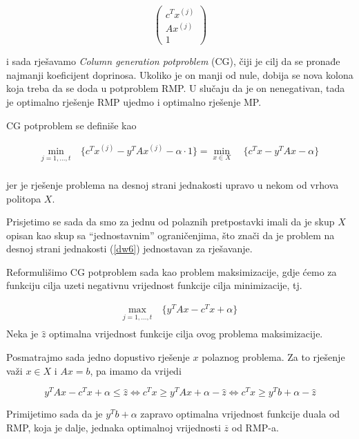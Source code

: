 \documentclass[a4paper, utf8, 11pt, colorlinks]{book}
\theoremstyle{definition}
\begin{document}
 $$\left(\begin{array}{c}
 	c^T x^{(j)}\\
 	A x^{(j)} \\
 	1 
 \end{array}\right)$$
 
 i sada rješavamo \emph{Column generation potproblem} (CG), čiji je cilj da se pronađe najmanji koeficijent doprinosa. Ukoliko je on manji od nule, dobija se nova kolona koja treba da se doda u potproblem RMP.  U slučaju da je on nenegativan, tada je optimalno rješenje RMP ujedmo i optimalno rješenje MP.
 
 CG potproblem se definiše kao
 
      \begin{equation}
 	\begin{aligned}\label{dw6}
 		\min_{j=1,\ldots,t}\  & \{c^T x^{(j)} -y^T	Ax^{(j)}-\alpha\cdot 1\}=\min_{x\in X}\  & \{c^Tx-y^T	Ax-\alpha\}\\
 	\end{aligned}
 \end{equation}
 
jer je rješenje problema na desnoj strani jednakosti upravo u nekom od vrhova politopa $X$.

Prisjetimo se sada da smo za jednu od polaznih pretpostavki imali da je skup $X$ opisan kao skup sa ``jednostavnim'' ograničenjima, što znači da je problem na desnoj strani jednakosti (\ref{dw6}) jednostavan za rješavanje.

Reformulišimo  CG potproblem sada kao problem maksimizacije, gdje ćemo za funkciju cilja uzeti negativnu vrijednost funkcije cilja minimizacije, tj.
 
 
       \begin{equation}
 	\begin{aligned}\label{dw7}
 		\max_{j=1,\ldots,t}\  &  \{y^T	Ax-c^Tx+\alpha\}\\
 	\end{aligned}
 \end{equation}
Neka je $\hat{z}$ optimalna vrijednost funkcije cilja ovog problema maksimizacije.

Posmatrajmo sada jedno dopustivo rješenje $x$ polaznog problema. Za to rješenje važi 
$x\in X$ i $Ax=b$, pa imamo da vrijedi %
 
 $$y^T	Ax-c^Tx+\alpha\leqslant \hat{z} \Leftrightarrow c^Tx\geqslant y^T	Ax+\alpha-\hat{z} \Leftrightarrow  c^T x \geqslant y^T b+\alpha-\hat{z}$$
 
 Primijetimo sada da je  $y^T b+\alpha$ zapravo  optimalna vrijednost funkcije duala od RMP, koja je dalje, jednaka optimalnoj vrijednosti $\overline{z}$ od RMP-a. 
 
\end{document}
